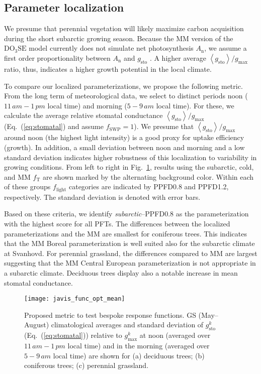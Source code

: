 \documentclass[bg, manuscript]{copernicus}
\begin{document}
\subsection{Parameter localization}
\label{subsec:res_local}

We presume that perennial vegetation will likely maximize carbon acquisition during the short subarctic growing season. Because the MM version of the $\mathrm{DO_3SE}$ model currently does not simulate net photosynthesis $A_\mathrm{n}$, we assume a first order proportionality between $A_\mathrm{n}$ and $g_\mathrm{sto}$ \citep{GCB:Medlyn2011}. A higher average $\left<g_\mathrm{sto}\right>/g_\mathrm{max}$ ratio, thus, indicates a higher growth potential in the local climate.

To compare our localized parameterizations, we propose the following metric. From the long term of meteorological data, we select to distinct periods noon ($11\,\unit{am}-1\,\unit{pm}$ local time) and morning ($5-9\,\unit{am}$ local time). For these, we calculate the average relative stomatal conductance $\left<g_\mathrm{sto}\right>/g_\mathrm{max}$ (Eq.~(\ref{eq:stomatal}) and assume $f_\mathrm{SWP}=1$). We presume that $\left<g_\mathrm{sto}\right>/g_\mathrm{max}$ around noon (the highest light intensity) is a good proxy for  uptake efficiency (growth). In addition, a small deviation between noon and morning and a low standard deviation indicates higher robustness of this localization to variability in growing conditions. From left to right in Fig.~\ref{fig:javis_func_opt_mean}, results using the subarctic, cold, and MM $f_\mathrm{T}$ are shown marked by the alternating background color. Within each of these groups $f_\mathrm{light}$ categories are indicated by PPFD0.8 and PPFD1.2, respectively. The standard deviation is denoted with error bars. 

Based on these criteria, we identify \emph{subarctic}--PPFD0.8 as the parameterization with the highest score for all PFTs. The differences between the localized parameterizations and the MM are smallest for coniferous trees. This indicates that the MM Boreal parameterization is well suited also for the subarctic climate at Svanhovd. For perennial grassland, the differences compared to MM are largest suggesting that the MM Central European parameterization is not appropriate in a subarctic climate. Deciduous trees display also a notable increase in mean stomatal conductance.

\begin{figure}[t]
  \texttt{[image: javis\_func\_opt\_mean]}
  \caption{Proposed metric to test bespoke response functions. GS (May--August) climatological averages and standard deviation of $g_\mathrm{sto}^k$ (Eq.~(\ref{eq:stomatal})) relative to $g_\mathrm{max}^k$ at noon (averaged over $11\,\unit{am}-1\,\unit{pm}$ local time) and in the morning (averaged over $5-9\,\unit{am}$ local time) are shown for (a) deciduous trees; (b) coniferous trees; (c) perennial grassland.}
  \label{fig:javis_func_opt_mean}
\end{figure}
\end{document}
